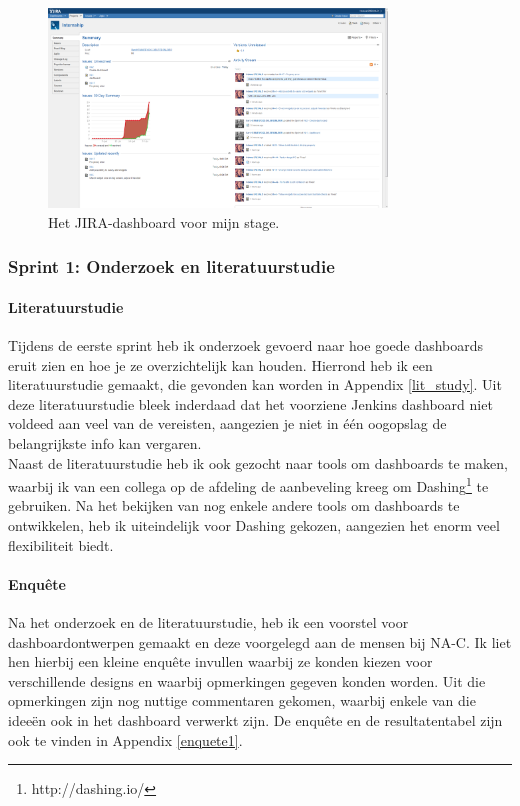 \documentclass[10pt,a4paper]{article}
\begin{document}
\begin{figure}[ht!]
\centering
\includegraphics[width=90mm]{myJIRAscreenshot.png}
\caption{Het JIRA-dashboard voor mijn stage.} 
\label{my_jira}
\end{figure}

\subsubsection{Sprint 1: Onderzoek en literatuurstudie} 
\label{sprint1}
\paragraph{Literatuurstudie} Tijdens de eerste sprint heb ik onderzoek gevoerd naar hoe goede dashboards eruit zien en hoe je ze overzichtelijk kan houden. Hierrond heb ik een literatuurstudie gemaakt, die gevonden kan worden in Appendix \ref{lit_study}. Uit deze literatuurstudie bleek inderdaad dat het voorziene Jenkins dashboard niet voldeed aan veel van de vereisten, aangezien je niet in \'e\'en oogopslag de belangrijkste info kan vergaren.\\
Naast de literatuurstudie heb ik ook gezocht naar tools om dashboards te maken, waarbij ik van een collega op de afdeling de aanbeveling kreeg om Dashing\footnote{http://dashing.io/} te gebruiken. Na het bekijken van nog enkele andere tools om dashboards te ontwikkelen, heb ik uiteindelijk voor Dashing gekozen, aangezien het enorm veel flexibiliteit biedt.
\paragraph{Enqu\^ete}
Na het onderzoek en de literatuurstudie, heb ik een voorstel voor dashboardontwerpen gemaakt en deze voorgelegd aan de mensen bij NA-C. Ik liet hen hierbij een kleine enqu\^ete invullen waarbij ze konden kiezen voor verschillende designs en waarbij opmerkingen gegeven konden worden. Uit die opmerkingen zijn nog nuttige commentaren gekomen, waarbij enkele van die idee\"en ook in het dashboard verwerkt zijn. De enqu\^ete en de resultatentabel zijn ook te vinden in Appendix \ref{enquete1}. 
\end{document}
